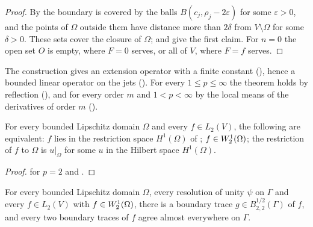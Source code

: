 \begin{proof}
\leanok
By  the boundary is covered by the balls
$B(c_j, \rho_j - 2\varepsilon)$ for some $\varepsilon > 0$, and the points of $\Omega$ outside
them have distance more than $2\delta$ from $V \setminus \Omega$ for some $\delta > 0$. These sets
cover the closure of $\Omega$;  and  give the
first claim. For $n = 0$ the open set $O$ is empty, where $F = 0$ serves, or all of $V$, where
$F = f$ serves.
\end{proof}

The construction gives an extension operator with a finite constant
(), hence a bounded linear operator on the jets
(). For every
$1 \leq p \leq \infty$ the theorem holds by reflection (), and for
every order $m$ and $1 < p < \infty$ by the local means of the derivatives of order $m$
().

\begin{corollary}[$H^1(\Omega) = \Sob{1}{2}(\Omega)$]
\label{cor:sobolev-extension-two}
\leanok
{}
For every bounded Lipschitz domain $\Omega$ and every $f \in L_2(V)$, the following are
equivalent: $f$ lies in the restriction space $H^1(\Omega)$ of
; $f \in W^{1}_{2}(\Omega)$; the restriction of $f$ to
$\Omega$ is $u|_\Omega$ for some $u$ in the Hilbert space $H^1(\Omega)$.
\end{corollary}

\begin{proof}
\leanok
{} for $p = 2$ and .
\end{proof}

\begin{corollary}
\label{cor:weak-sobolev-trace}
\leanok
{}
For every bounded Lipschitz domain $\Omega$, every resolution of unity $\psi$ on $\Gamma$ and
every $f \in L_2(V)$ with $f \in W^{1}_{2}(\Omega)$, there is a boundary trace
$g \in B^{1/2}_{2,2}(\Gamma)$ of $f$, and every two boundary traces of $f$ agree almost everywhere
on $\Gamma$.
\end{corollary}

